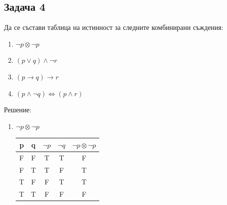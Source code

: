 \documentclass[fleqn, 12pt]{article}
\theoremstyle{definition}
\begin{document}
\subsection*{Задача 4}
Да се състави таблица на истинност за следните комбинирани съждения:
\begin{enumerate}
\item $\neg p \otimes \neg p$
\item $(p \lor q) \land \neg r$
\item $(p \to q) \to r$
\item $(p \land \neg q) \Leftrightarrow (p \land r)$
\end{enumerate}
Решение: 
\begin{enumerate}
\item $\neg p \otimes \neg p$
\begin{table}[htp]
  \begin{center}
    \begin{tabular}{|c|c|c|c|c|} 
\hline
      \textbf{p} & \textbf{q}  & \textbf{ $\neg p$ } & \textbf{$\neg q$} & \textbf{ $\neg p \otimes \neg p$}\\
      \hline
	F & F & T & T & F\\
\hline
	F & T & T & F & T\\
\hline
	T & F & F  & T & T\\
\hline
 	T & T & F  & F & F\\
\hline
    \end{tabular}
  \end{center}
\end{table}


\end{enumerate}
\end{document}
